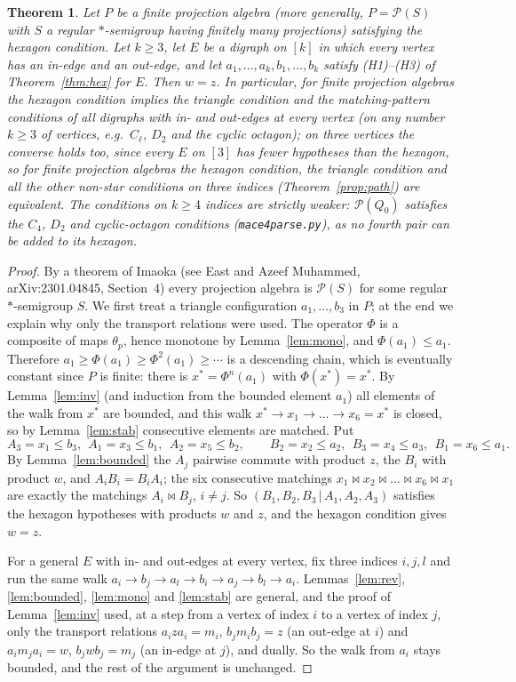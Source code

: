 \documentclass[11pt]{amsart}
\newtheorem{theorem}{Theorem}[section]
\theoremstyle{definition}
\renewcommand{\P}{\mathcal{P}}
\newcommand{\mt}{\bowtie}   %
\begin{document}
\begin{theorem}\label{thm:equiv}
Let $P$ be a finite projection algebra (more generally, $P=\P(S)$ with $S$ a regular $*$-semigroup having finitely many projections) satisfying the hexagon condition. Let $k\ge3$, let $E$ be a digraph on $[k]$ in which every vertex has an in-edge and an out-edge, and let $a_1,\dots,a_k,b_1,\dots,b_k$ satisfy (H1)--(H3) of Theorem~\ref{thm:hex} for $E$. Then $w=z$. In particular, for finite projection algebras the hexagon condition implies the triangle condition and the matching-pattern conditions of all digraphs with in- and out-edges at every vertex (on any number $k\ge3$ of vertices, e.g.\ $C_\ell$, $D_2$ and the cyclic octagon); on three vertices the converse holds too, since every $E$ on $[3]$ has fewer hypotheses than the hexagon, so for finite projection algebras the hexagon condition, the triangle condition and all the other non-star conditions on three indices (Theorem~\ref{prop:path}) are equivalent. The conditions on $k\ge4$ indices are strictly weaker: $\P(Q_0)$ satisfies the $C_4$, $D_2$ and cyclic-octagon conditions (\texttt{mace4parse.py}), as no fourth pair can be added to its hexagon.
\end{theorem}
\begin{proof}
By a theorem of Imaoka (see East and Azeef Muhammed, arXiv:2301.04845, Section~4) every projection algebra is $\P(S)$ for some regular $*$-semigroup $S$. We first treat a triangle configuration $a_1,\dots,b_3$ in $P$; at the end we explain why only the transport relations were used. The operator $\Phi$ is a composite of maps $\theta_p$, hence monotone by Lemma~\ref{lem:mono}, and $\Phi(a_1)\le a_1$. Therefore $a_1\ge\Phi(a_1)\ge\Phi^2(a_1)\ge\cdots$ is a descending chain, which is eventually constant since $P$ is finite: there is $x^*=\Phi^n(a_1)$ with $\Phi(x^*)=x^*$. By Lemma~\ref{lem:inv} (and induction from the bounded element $a_1$) all elements of the walk from $x^*$ are bounded, and this walk $x^*\to x_1\to\dots\to x_6=x^*$ is closed, so by Lemma~\ref{lem:stab} consecutive elements are matched. Put
\[
A_3=x_1\le b_3,\ \ A_1=x_3\le b_1,\ \ A_2=x_5\le b_2,\qquad B_2=x_2\le a_2,\ \ B_3=x_4\le a_3,\ \ B_1=x_6\le a_1 .
\]
By Lemma~\ref{lem:bounded} the $A_j$ pairwise commute with product $z$, the $B_i$ with product $w$, and $A_iB_i=B_iA_i$; the six consecutive matchings $x_1\mt x_2\mt\dots\mt x_6\mt x_1$ are exactly the matchings $A_i\mt B_j$, $i\ne j$. So $(B_1,B_2,B_3\,|\,A_1,A_2,A_3)$ satisfies the hexagon hypotheses with products $w$ and $z$, and the hexagon condition gives $w=z$.

For a general $E$ with in- and out-edges at every vertex, fix three indices $i,j,l$ and run the same walk $a_i\to b_j\to a_l\to b_i\to a_j\to b_l\to a_i$. Lemmas~\ref{lem:rev}, \ref{lem:bounded}, \ref{lem:mono} and \ref{lem:stab} are general, and the proof of Lemma~\ref{lem:inv} used, at a step from a vertex of index $i$ to a vertex of index $j$, only the transport relations $a_iza_i=m_i$, $b_jm_ib_j=z$ (an out-edge at $i$) and $a_im_ja_i=w$, $b_jwb_j=m_j$ (an in-edge at $j$), and dually. So the walk from $a_i$ stays bounded, and the rest of the argument is unchanged.
\end{proof}
\end{document}
